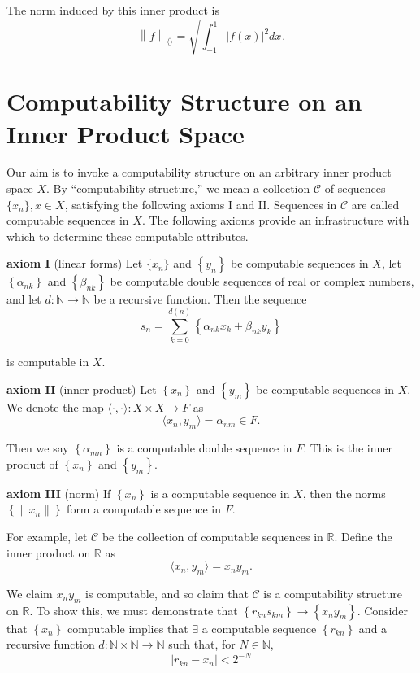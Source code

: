 \documentclass[a4paper,10pt]{article}
\begin{document}
The norm induced by this inner product is
\[\left\|f\right\|_{\langle\rangle} = \sqrt{\int_{-1}^{1}\left|f(x)\right|^2dx}.\]

\section{Computability Structure on an Inner Product Space}

Our aim is to invoke a computability structure on an arbitrary inner product space $X$.  By ``computability structure,'' we mean a collection $\mathscr{C}$ of sequences $\{x_n\}, x \in X$, satisfying the following axioms I and II.  Sequences in $\mathscr{C}$ are called computable sequences in $X$.  The following axioms provide an infrastructure with which to determine these computable attributes.

\begin{list}{}{}
 \item \textbf{axiom I} (linear forms) Let $\{x_n\}$ and $\left\{y_n\right\}$ be computable sequences in $X$, let $\left\{\alpha_{nk}\right\}$ and $\left\{\beta_{nk}\right\}$ be computable double sequences of real or complex numbers, and let $d:\mathbb{N}\to\mathbb{N}$ be a recursive function.  Then the sequence
\[s_n = \displaystyle\sum_{k = 0}^{d(n)} \left\{\alpha_{nk}x_k + \beta_{nk}y_k\right\}\]
 
 is computable in $X$.
 \item \textbf{axiom II} (inner product) Let $\left\{x_n\right\}$ and $\left\{y_m\right\}$ be computable sequences in $X$.  We denote the map $\langle \cdot,\cdot \rangle:X\times X \to F$ as 
\[\langle x_n, y_m \rangle = \alpha_{nm} \in F.\]
 
 Then we say $\left\{\alpha_{mn}\right\}$ is a computable double sequence in $F$.  This is the inner product of $\left\{x_n \right\}$ and $\left\{y_m\right\}$.
 \item \textbf{axiom III} (norm) If $\left\{x_{n}\right\}$ is a computable sequence in $X$, then the norms $\left\{\|x_n\|\right\}$ form a computable sequence in $F$.
\end{list}

For example, let $\mathscr{C}$ be the collection of computable sequences in $\mathbb{R}$.  Define the inner product on $\mathbb{R}$ as
\[\langle x_n,y_m \rangle = x_ny_m.\]

We claim $x_ny_m$ is computable, and so claim that $\mathscr{C}$ is a computability structure on $\mathbb{R}$.  To show this, we must demonstrate that $\left\{r_{kn}s_{km}\right\} \to \left\{x_{n}y_{m}\right\}$.  Consider that $\left\{x_n\right\}$ computable implies that $\exists$ a computable sequence $\left\{r_{kn}\right\}$ and a recursive function $d:\mathbb{N}\times\mathbb{N}\to\mathbb{N}$ such that, for $N \in \mathbb{N}$,
\[\left|r_{kn} - x_n\right| < 2^{-N}\]
\end{document}
